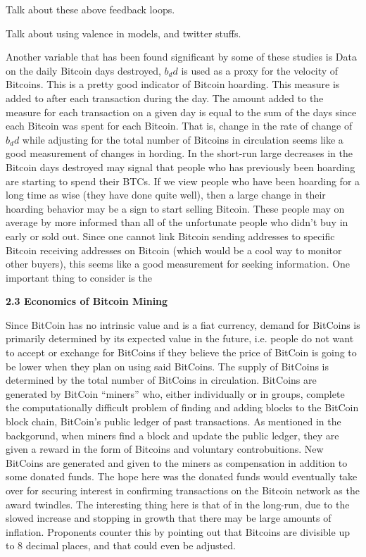 \documentclass{article}[10 pt]
\newcommand{\vs}{\vspace{0.1in}}
\begin{document}
\vs

Talk about these above feedback loops.

\vs

Talk about using valence in models, and twitter stuffs.

\vs

Another variable that has been found significant by some of these studies is 
Data on the daily Bitcoin days destroyed,
$b_dd$ is used as a proxy for the velocity of Bitcoins. This is a pretty
good indicator of Bitcoin hoarding. This measure is added to after each
transaction during the day. The amount added to the measure for each
transaction on a given day is equal to the sum of the days since each
Bitcoin was spent for each Bitcoin. That is, change in the rate of change of
$b_dd$ while adjusting for the total number of Bitcoins in circulation
seems like a good measurement of changes in hording. In the short-run large
decreases in the Bitcoin days destroyed may signal that people who has
previously been hoarding are starting to spend their BTCs. If we view people
who have been hoarding for a long time as wise (they have done quite well), 
then a large change in their hoarding behavior may be a sign to start
selling Bitcoin. These people may on average by more informed than all of
the unfortunate people who didn't buy in early or sold out. Since one cannot
link Bitcoin sending addresses to specific Bitcoin receiving addresses on
Bitcoin (which would be a cool way to monitor other buyers), this seems
like a good measurement for seeking information. One important thing to
consider is the 

\vs

\textbf{2.3 Economics of Bitcoin Mining}

\vs

Since BitCoin has no intrinsic value and is a fiat currency, demand for
BitCoins is primarily determined by its expected value in the future, i.e.
people do not want to accept or exchange for BitCoins if they believe the
price of BitCoin is going to be lower when they plan on using said BitCoins.
The supply of BitCoins is determined by the total number of BitCoins in
circulation. BitCoins are generated by BitCoin “miners” who, either
individually or in groups, complete the computationally difficult problem of
finding and adding blocks to the BitCoin block chain, BitCoin’s public
ledger of past transactions. As mentioned in the backgorund, when miners find a block and update the public
ledger, they are given a reward in the form of Bitcoins and voluntary
controbuitions. New BitCoins are generated and given to the miners as
compensation in addition to some donated funds. The hope here was the
donated funds would eventually take over for securing interest in confirming
transactions on the Bitcoin network as the award twindles. The interesting
thing here is that of in the long-run, due to the slowed increase and
stopping in growth that there may be large amounts of inflation. Proponents
counter this by pointing out that Bitcoins are divisible up to 8 decimal
places, and that could even be adjusted.
\end{document}
